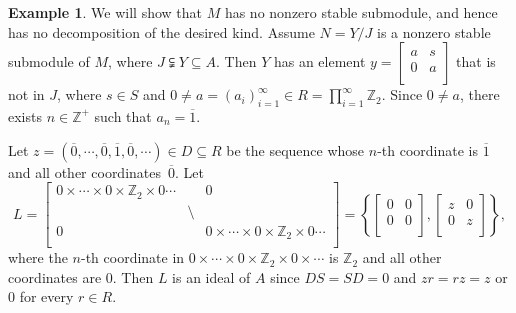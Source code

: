 \documentclass[11pt,a4paper]{amsart}
\theoremstyle{plain}
\theoremstyle{definition}
\newtheorem{example}[theorem]{Example}
\theoremstyle{remark}
\newcommand{\Z}{{\mathbb{Z}}}
\begin{document}
\begin{example}
We will show that $ M $
has no nonzero stable submodule, and hence has no decomposition of the desired
kind. Assume $N=Y/{J}$ is a nonzero stable submodule of $ M $, where ${J}\subsetneqq Y \subseteq A$. Then $Y$ has an element $y=\left[
 \begin{array}{ll}
a & s \\
 0 & a \\
 \end{array}
\right]$ that is not in ${J}$, where $s\in S$ and $0\neq a =(a_i)_{i=1}^{\infty}\in R=\prod \limits_{i=1}^{\infty}\Z_{2}$. Since $0\neq a$, there exists $n\in \Z^{+}$ such that $a_n=\overline{1}$. {Let $z=(\overline{0},\cdots ,\overline{0},\overline{1},\overline{0},\cdots)\in D\subseteq R$ be the sequence whose $n$-th coordinate is $\overline{1}$ and all other coordinates~$\overline{0}$. Let
                      \[L=\left[
                        \begin{array}{lll}
                      0 \times \cdots\times 0 \times \Z_{2} \times 0\cdots  & & 0\\
                        &\setminus & \\
                    0& & 0 \times \cdots\times 0\times \Z_{2} \times 0 \cdots \\
                     \end{array}
\right]=\left\{ \left[
                                 \begin{array}{ll}
                                   0 & 0 \\
                                   0 & 0 \\
                                 \end{array}
                               \right],  \left[
                                 \begin{array}{ll}
                                   z & 0 \\
                                   0 & z \\
                                 \end{array}
                               \right]  \right\}  ,\] where the $n$-th coordinate in $ 0 \times \cdots\times 0 \times \Z_{2} \times 0\times \cdots$ is $\Z_2$ and all other coordinates are $0$.
Then
 $L$ is an ideal of $A$ since $DS=SD=0$ and $zr=rz=z $ or $0$  for every $ r\in R$.


}
\end{example}
\end{document}
